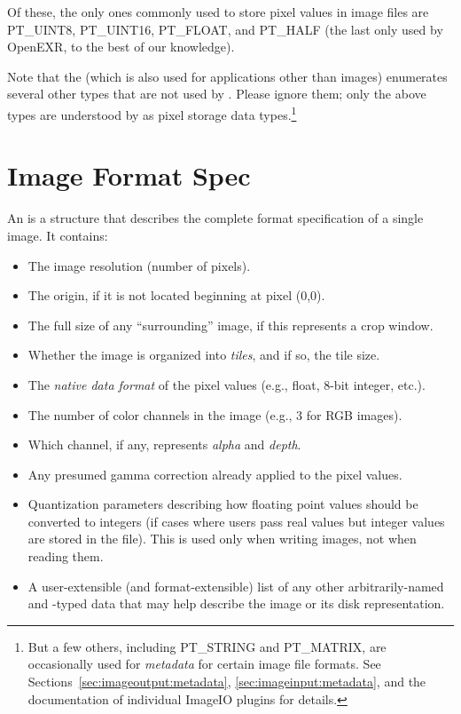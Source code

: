 Of these, the only ones commonly used to store pixel values in image files
are {\cf PT_UINT8}, {\cf PT_UINT16}, {\cf PT_FLOAT}, and {\cf PT_HALF}
(the last only used by OpenEXR, to the best of our knowledge).

Note that the \ParamBaseType (which is also used for applications other
than images) enumerates several other types that are not used by
\product.  Please ignore them; only the above types are understood by
\product as pixel storage data types.\footnote{But a few others, including
{\cf PT_STRING} and {\cf PT_MATRIX}, are occasionally used for
\emph{metadata} for certain image file formats. See
Sections~\ref{sec:imageoutput:metadata}, \ref{sec:imageinput:metadata},
and the documentation of individual ImageIO plugins for details.}

\section{Image Format Spec}

An \ImageSpec is a structure that describes the complete
format specification of a single image.  It contains:

\begin{itemize}
\item The image resolution (number of pixels).
\item The origin, if it is not located beginning at pixel (0,0).
\item The full size of any ``surrounding'' image, if this represents a crop
  window.
\item Whether the image is organized into \emph{tiles}, and if so, the
  tile size.
\item The \emph{native data format} of the pixel values (e.g., float, 8-bit
  integer, etc.).
\item The number of color channels in the image (e.g., 3 for RGB
  images).
\item Which channel, if any, represents \emph{alpha} and \emph{depth}.
\item Any presumed gamma correction already applied to the pixel values.
\item Quantization parameters describing how floating point values
  should be converted to integers (if cases where users pass real values
  but integer values are stored in the file).  This is used only when
  writing images, not when reading them.
\item A user-extensible (and format-extensible) list of any other
  arbitrarily-named and -typed data that may help describe the image or
  its disk representation.
\end{itemize}

